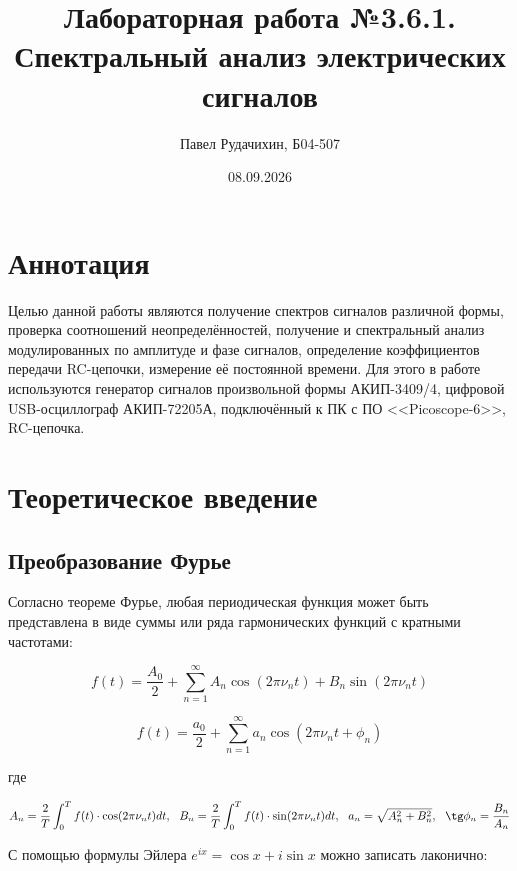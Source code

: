 \documentclass{article}
\title{Лабораторная работа №3.6.1. \\ \textbf{Спектральный анализ электрических сигналов}}
\author{Павел Рудачихин, Б04-507}
\date{08.09.2026}
\begin{document}
\maketitle{}


\section {Аннотация} 
	\hspace{4mm} Целью данной работы являются получение спектров сигналов различной формы, проверка соотношений неопределённостей, получение и спектральный анализ модулированных по амплитуде и фазе сигналов, определение коэффициентов передачи RC-цепочки, измерение её постоянной времени. Для этого в работе используются генератор сигналов произвольной формы АКИП-3409/4, цифровой USB-осциллограф АКИП-72205А, подключённый к ПК с ПО <<Picoscope-6>>, RC-цепочка. 

\section {Теоретическое введение}
	
	\subsection {Преобразование Фурье}
	
		\hspace{4mm} Согласно теореме Фурье, любая периодическая функция может быть представлена в виде суммы или ряда гармонических функций с кратными частотами:
		
		\begin{equation}
			f(t) = \frac{A_0}{2} + \sum_{n=1}^{\infty} A_n \cos(2\pi \nu_n t) + B_n \sin(2\pi \nu_n t)
		\end{equation}
		
		\begin{equation}
			f(t) = \frac{a_0}{2} + \sum_{n=1}^{\infty} a_n \cos(2\pi \nu_n t + \phi_n)
		\end{equation}
		
		где 
		
		\begin{equation}
			A_n = \frac{2}{T} \int_0^Tf(t)\cdot \cos(2\pi \nu_n t) dt, \  \ B_n = \frac{2}{T} \int_0^Tf(t)\cdot \sin(2\pi \nu_n t) dt, \  \ a_n = \sqrt{A_n^2 + B_n^2}, \ \ \tg\phi_n = \dfrac{B_n}{A_n}
		\end{equation}
		
		С помощью формулы Эйлера $e^{ix} = \cos x + i \sin x$ можно записать лаконично:
		
\end{document}
